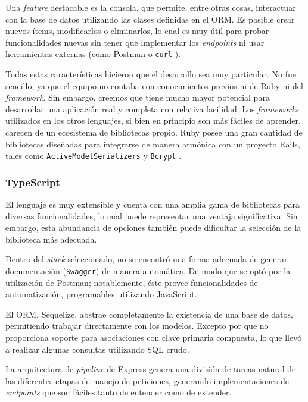 \documentclass[11pt]{article}
\let\Oldsubsubsection\subsubsection
\renewcommand{\subsubsection}{\FloatBarrier\Oldsubsubsection}
\newcommand{\english}[1]{\textit{#1}}
\begin{document}
Una \english{feature} destacable es la consola, que permite, entre otras cosas, interactuar con la base de datos utilizando las clases definidas en el ORM. Es posible crear nuevos ítems, modificarlos o eliminarlos, lo cual es muy útil para probar funcionalidades nuevas sin tener que implementar los \english{endpoints} ni usar herramientas externas (como Postman \cite{js:ex:postman} o \lstinline{curl} \cite{http:curl}).

Todas estas características hicieron que el desarrollo sea muy particular. No fue sencillo, ya que el equipo no contaba con conocimientos previos ni de Ruby ni del \english{framework}. Sin embargo, creemos que tiene mucho mayor potencial para desarrollar una aplicación real y completa con relativa facilidad. Los \english{frameworks} utilizados en los otros lenguajes, si bien en principio son más fáciles de aprender, carecen de un ecosistema de bibliotecas propio. Ruby posee una gran cantidad de bibliotecas diseñadas para integrarse de manera armónica con un proyecto Rails, tales como \lstinline{ActiveModelSerializers} \cite{http:ruby:active_model_serializer} y \lstinline{Bcrypt} \cite{http:ruby:bcrypt}.

\subsubsection{TypeScript}

El lenguaje es muy extensible y cuenta con una amplia gama de bibliotecas para diversas funcionalidades, lo cual puede representar una ventaja significativa. Sin embargo, esta abundancia de opciones también puede dificultar la selección de la biblioteca más adecuada.

Dentro del \english{stack} seleccionado, no se encontró una forma adecuada de generar documentación (\lstinline{Swagger}) de manera automática. De modo que se optó por la utilización de Postman; notablemente, éste provee funcionalidades de automatización, programables utilizando JavaScript.

El ORM, Sequelize, abstrae completamente la existencia de una base de datos, permitiendo trabajar directamente con los modelos. Excepto por que no proporciona soporte para asociaciones con clave primaria compuesta, lo que llevó a realizar algunas consultas utilizando SQL crudo.

La arquitectura de \english{pipeline} de Express genera una división de tareas natural de las diferentes etapas de manejo de peticiones, generando implementaciones de \english{endpoints} que son fáciles tanto de entender como de extender.
\end{document}
